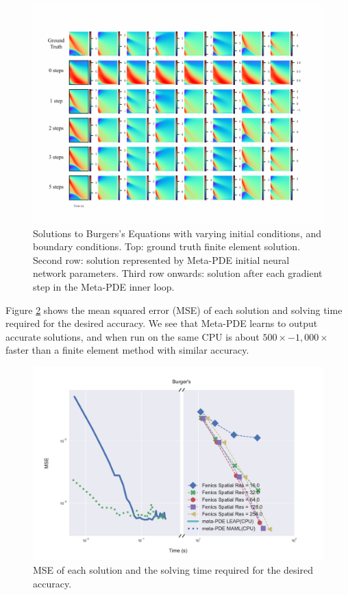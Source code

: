 \begin{figure}
  \centering
\includegraphics[width=0.7\linewidth]{figures/burgers_meta.pdf}
\caption{Solutions to Burgers's Equations with varying initial conditions, and boundary conditions. Top: ground truth finite element solution. Second row: solution represented by Meta-PDE initial neural network parameters. Third row onwards: solution after each gradient step in the Meta-PDE inner loop.}
\label{fig:burgers_per_step}
\end{figure}

Figure \ref{fig:burgers_summary} shows the mean squared error (MSE) of each solution and solving time required for the desired accuracy. We see that Meta-PDE learns to output accurate solutions, and when run on the same CPU is about $500\times - 1,000\times$ faster than a finite element method with similar accuracy. 


\begin{figure}
  \centering
\includegraphics[width=1.0\linewidth]{figures/burgers.pdf}
\caption{MSE of each solution and the solving time required for the desired accuracy.}%
\label{fig:burgers_summary}%
\end{figure}


